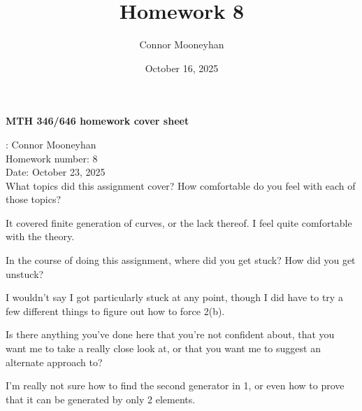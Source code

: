 \documentclass[12pt]{article}
\title{Homework 8}
\author{Connor Mooneyhan}
\date{October 16, 2025}
\theoremstyle{definition}
\begin{document}
\begin{center}
	{\bf\Large MTH 346/646 homework cover sheet}
\end{center}

\vspace{0.5in}

: Connor Mooneyhan \\
{\large Homework number}: 8 \\
{\large Date}: October 23, 2025 \\

{\Large What topics did this assignment cover? How comfortable do you feel with
each of those topics?}

It covered finite generation of curves, or the lack thereof.
I feel quite comfortable with the theory.


\vspace{1.75in}

{\Large In the course of doing this assignment, where did you get stuck?
	How did you get unstuck?}

  I wouldn't say I got particularly stuck at any point, though I did have to try a few different things to figure out how to force 2(b).


\vspace{1.75in}

{\Large Is there anything you've done here that you're not confident about, that you want me to take a really close look at, or that you want me to suggest an alternate approach to?}

I'm really not sure how to find the second generator in 1, or even how to prove that it can be generated by only 2 elements.

\pagebreak
\end{document}
